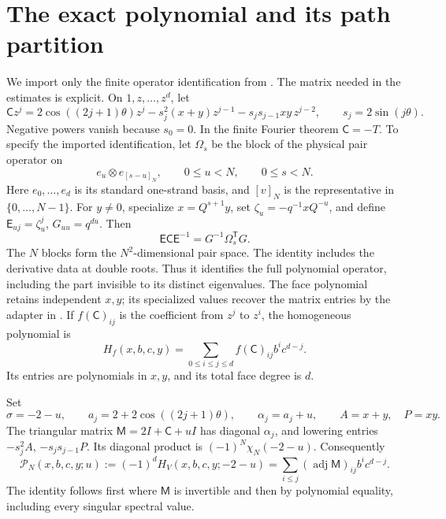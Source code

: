\section{The exact polynomial and its path partition}\label{lc:source}
We import only the finite operator identification from \cite{FinitePaper}.
The matrix needed in the estimates is explicit. On \(1,z,\ldots,z^d\),
let
\begin{equation}\label{lc:banded}
 \mathsf C z^j=2\cos((2j+1)\theta)z^j
       -s_j^2(x+y)z^{j-1}-s_js_{j-1}xy\,z^{j-2},
 \qquad s_j=2\sin(j\theta).
\end{equation}\aliascurrentequation{\label{sa:operator}}
Negative powers vanish because \(s_0=0\). In the finite Fourier theorem
\(\mathsf C=-T\). To specify the imported identification, let
\(\Omega_s\) be the block of the physical pair operator on
\[
 e_u\otimes e_{[s-u]_N},\qquad 0\le u<N,\qquad 0\le s<N.
\]
Here \(e_0,\ldots,e_d\) is its standard one-strand basis, and
\([v]_N\) is the representative in \(\{0,\ldots,N-1\}\).
For \(y\ne0\), specialize \(x=Q^{s+1}y\), set
\(\zeta_u=-q^{-1}xQ^{-u}\), and define
\(\mathsf E_{uj}=\zeta_u^j\), \(G_{uu}=q^{du}\). Then
\begin{equation}\label{lc:residue-adapter}
 \mathsf E\mathsf C\mathsf E^{-1}
                     =G^{-1}\Omega_s^{\mathsf T}G.
\end{equation}
The \(N\) blocks form the \(N^2\)-dimensional pair space. The identity includes the derivative data at double roots. Thus it
identifies the full polynomial operator, including the part invisible
to its distinct eigenvalues. The face
polynomial retains independent \(x,y\); its specialized values recover
the matrix entries by the adapter in \cite[equation (4.5)]{FinitePaper}.
If \(f(\mathsf C)_{ij}\) is the coefficient from \(z^j\)
to \(z^i\), the homogeneous polynomial is
\[
 H_f(x,b,c,y)=\sum_{0\le i\le j\le d}f(\mathsf C)_{ij}b^ic^{d-j}.
\]
Its entries are polynomials in \(x,y\), and its total face degree is \(d\).

Set
\begin{equation}\label{lc:diagonal}
 \sigma=-2-u,\qquad a_j=2+2\cos((2j+1)\theta),\qquad
 \alpha_j=a_j+u,\qquad A=x+y,\quad P=xy.
\end{equation}
The triangular matrix \(\mathsf M=2I+\mathsf C+uI\) has diagonal
\(\alpha_j\), and lowering entries \(-s_j^2A\), \(-s_js_{j-1}P\).
Its diagonal product is \((-1)^N\chi_N(-2-u)\). Consequently
\begin{equation}\label{lc:adjugate}
 \mathcal P_N(x,b,c,y;u):=(-1)^dH_V(x,b,c,y;-2-u)
       =\sum_{i\le j}(\operatorname{adj}\mathsf M)_{ij}b^ic^{d-j}.
\end{equation}
The identity follows first where \(\mathsf M\) is invertible and then
by polynomial equality, including every singular spectral value.

